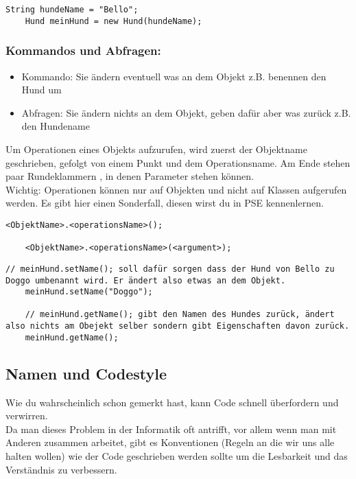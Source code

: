 \begin{lstlisting}[title=\textbf{Beispiel: Variable}]
	String hundeName = "Bello";
	Hund meinHund = new Hund(hundeName);
\end{lstlisting}

\begin{Infobox}
	\subsubsection*{Kommandos und Abfragen:}
	\begin{itemize}
		\item Kommando: Sie ändern eventuell was an dem Objekt z.B. benennen den Hund um
		\item Abfragen: Sie ändern nichts an dem Objekt, geben dafür aber was zurück z.B. den Hundename
	\end{itemize}
	Um Operationen eines Objekts aufzurufen, wird zuerst der Objektname geschrieben, gefolgt von einem Punkt und dem Operationsname.
	Am Ende stehen paar Rundeklammern \q{()}, in denen Parameter stehen können.\\
	{\color{red} Wichtig: } Operationen können nur auf Objekten und nicht auf Klassen aufgerufen werden.
	Es gibt hier einen Sonderfall, diesen wirst du in PSE kennenlernen.
\end{Infobox}

\begin{lstlisting}[title=\textbf{Kommando/Abfrage Syntax}]
	<ObjektName>.<operationsName>();

	<ObjektName>.<operationsName>(<argument>);
\end{lstlisting}

\begin{lstlisting}[title=\textbf{Beispiel: Kommando/Abfrage}]
	// meinHund.setName(); soll dafür sorgen dass der Hund von Bello zu Doggo umbenannt wird. Er ändert also etwas an dem Objekt.
	meinHund.setName("Doggo");

	// meinHund.getName(); gibt den Namen des Hundes zurück, ändert also nichts am Obejekt selber sondern gibt Eigenschaften davon zurück.
	meinHund.getName();
\end{lstlisting}

\subsection*{Namen und Codestyle}
Wie du wahrscheinlich schon gemerkt hast, kann Code schnell überfordern und verwirren.\\
Da man dieses Problem in der Informatik oft antrifft, vor allem wenn man mit Anderen zusammen arbeitet, gibt es Konventionen (Regeln an die wir uns alle halten wollen) wie der Code geschrieben werden sollte um die Lesbarkeit und das Verständnis zu verbessern.

